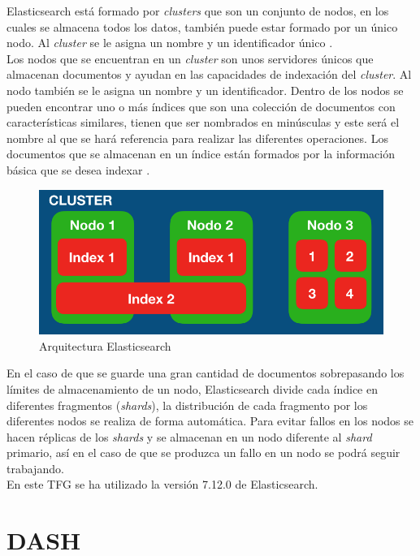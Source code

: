 Elasticsearch está formado por \textit{clusters} que son un conjunto de nodos, en los cuales se almacena todos los datos, también puede estar formado por un único nodo. Al \textit{cluster} se le asigna un nombre y un identificador único \cite{elastic3}.\\

Los nodos que se encuentran en un \textit{cluster} son unos servidores únicos que almacenan documentos y ayudan en las capacidades de indexación del \textit{cluster}. Al nodo también se le asigna un nombre y un identificador. Dentro de los nodos se pueden encontrar uno o más índices que son una colección de documentos con características similares, tienen que ser nombrados en minúsculas y este será el nombre al que se hará referencia para realizar las diferentes operaciones. Los documentos que se almacenan en un índice están formados por la información básica que se desea indexar \cite{elastic3}.\\



\begin{figure}[H]
    \centering
    \includegraphics[width=12cm, keepaspectratio]{img/arquitectura_elastic.png}
    \caption{Arquitectura Elasticsearch}
    \label{fig:elastic}
\end{figure}
En el caso de que se guarde una gran cantidad de documentos sobrepasando los límites de almacenamiento de un nodo, Elasticsearch divide cada índice en diferentes fragmentos (\textit{shards}), la distribución de cada fragmento por los diferentes nodos se realiza de forma automática. Para evitar fallos en los nodos se hacen réplicas de los \textit{shards} y se almacenan en un nodo diferente al \textit{shard} primario, así en el caso de que se produzca un fallo en un nodo se podrá seguir trabajando.\\

En este TFG se ha utilizado la versión 7.12.0 de Elasticsearch.


\section{DASH}

